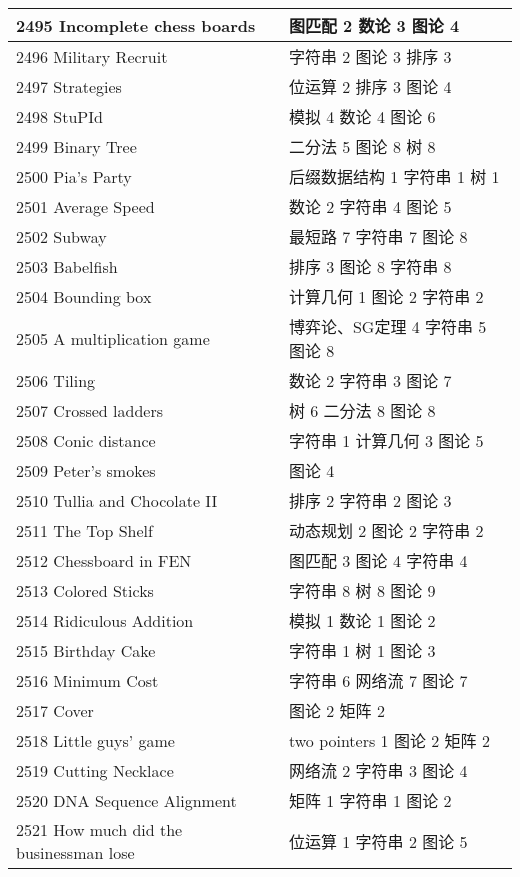 \begin{longtable}{| p{} | p{} |}
 2495 Incomplete chess boards  & 图匹配 2 数论 3 图论 4 \\ \hline
 2496 Military Recruit  & 字符串 2 图论 3 排序 3 \\ \hline
 2497 Strategies  & 位运算 2 排序 3 图论 4 \\ \hline
 2498 StuPId  & 模拟 4 数论 4 图论 6 \\ \hline
 2499 Binary Tree  & 二分法 5 图论 8 树 8 \\ \hline
 2500 Pia's Party  & 后缀数据结构 1 字符串 1 树 1 \\ \hline
 2501 Average Speed  & 数论 2 字符串 4 图论 5 \\ \hline
 2502 Subway  & 最短路 7 字符串 7 图论 8 \\ \hline
 2503 Babelfish  & 排序 3 图论 8 字符串 8 \\ \hline
 2504 Bounding box  & 计算几何 1 图论 2 字符串 2 \\ \hline
 2505 A multiplication game  & 博弈论、SG定理 4 字符串 5 图论 8 \\ \hline
 2506 Tiling  & 数论 2 字符串 3 图论 7 \\ \hline
 2507 Crossed ladders  & 树 6 二分法 8 图论 8 \\ \hline
 2508 Conic distance  & 字符串 1 计算几何 3 图论 5 \\ \hline
 2509 Peter's smokes  & 图论 4 \\ \hline
 2510 Tullia and Chocolate II  & 排序 2 字符串 2 图论 3 \\ \hline
 2511 The Top Shelf  & 动态规划 2 图论 2 字符串 2 \\ \hline
 2512 Chessboard in FEN  & 图匹配 3 图论 4 字符串 4 \\ \hline
 2513 Colored Sticks  & 字符串 8 树 8 图论 9 \\ \hline
 2514 Ridiculous Addition  & 模拟 1 数论 1 图论 2 \\ \hline
 2515 Birthday Cake  & 字符串 1 树 1 图论 3 \\ \hline
 2516 Minimum Cost  & 字符串 6 网络流 7 图论 7 \\ \hline
 2517 Cover  & 图论 2 矩阵 2 \\ \hline
 2518 Little guys' game  & two pointers 1 图论 2 矩阵 2 \\ \hline
 2519 Cutting Necklace  & 网络流 2 字符串 3 图论 4 \\ \hline
 2520 DNA Sequence Alignment  & 矩阵 1 字符串 1 图论 2 \\ \hline
 2521 How much did the businessman lose  & 位运算 1 字符串 2 图论 5 \\ \hline

\end{longtable}
